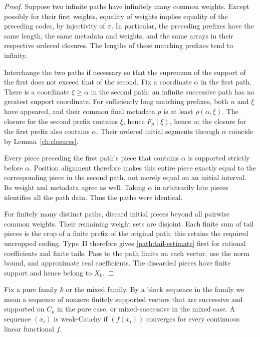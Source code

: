 \begin{proof}
Suppose two infinite paths have infinitely many common weights.
Except possibly for their first weights, equality of weights implies
equality of the preceding codes, by injectivity of $\sigma$.
In particular, the preceding prefixes have the same length, the same
metadata and weights, and the same arrays in their respective ordered
closures.  The lengths of these matching prefixes tend to infinity.

Interchange the two paths if necessary so that the supremum of the
support of the first does not exceed that of the second.  Fix a
coordinate $\alpha$ in the first path.  There is a coordinate
$\xi\ge\alpha$ in the second path: an infinite successive path has no
greatest support coordinate.  For sufficiently long matching prefixes,
both $\alpha$ and $\xi$ have appeared, and their common final metadata
$p$ is at least $\rho(\alpha,\xi)$.  The closure for the second prefix
contains $\xi$, hence $F_p(\xi)$, hence $\alpha$; the closure for the
first prefix also contains $\alpha$.  Their ordered initial segments
through $\alpha$ coincide by Lemma~\ref{ch:closures}.

Every piece preceding the first path's piece that contains $\alpha$
is supported strictly before $\alpha$.  Position alignment therefore
makes this entire piece exactly equal to the corresponding piece in
the second path, not merely equal on an initial interval.  Its weight
and metadata agree as well.  Taking $\alpha$ in arbitrarily late
pieces identifies all the path data.  Thus the paths were identical.

For finitely many distinct paths, discard initial pieces beyond all
pairwise common weights.  Their remaining weight sets are disjoint.
Each finite sum of tail pieces is the crop of a finite prefix of the
original path; this retains the required uncropped coding.  Type~II
therefore gives \eqref{path:tail-estimate} first for rational coefficients
and finite tails.  Pass to the path limits on each vector, use the norm
bound, and approximate real coefficients.  The discarded pieces have
finite support and hence belong to $X_0$.
\end{proof}

Fix a pure family $k$ or the mixed family.  By a block sequence in the
family we mean a sequence of nonzero finitely supported vectors that
are successive and supported on $C_k$ in the pure case, or
mixed-successive in the mixed case.  A sequence $(x_i)$ is weak-Cauchy
if $(f(x_i))$ converges for every continuous linear functional $f$.

